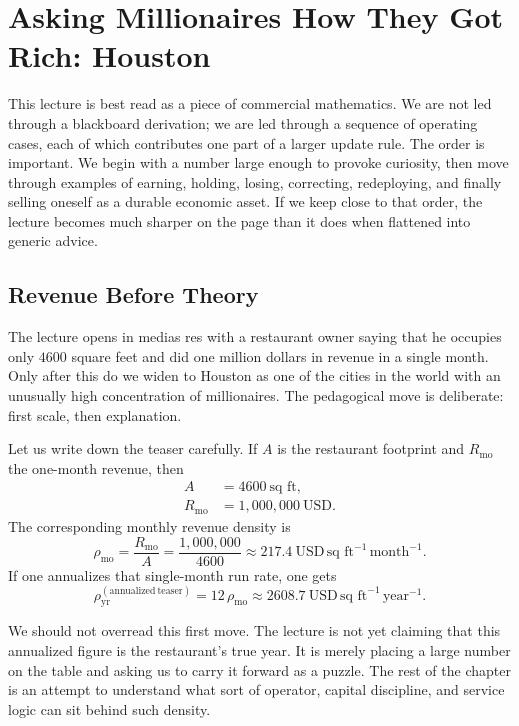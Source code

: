\chapter{Asking Millionaires How They Got Rich: Houston}

This lecture is best read as a piece of commercial mathematics. We are not led through a blackboard derivation; we are led through a sequence of operating cases, each of which contributes one part of a larger update rule. The order is important. We begin with a number large enough to provoke curiosity, then move through examples of earning, holding, losing, correcting, redeploying, and finally selling oneself as a durable economic asset. If we keep close to that order, the lecture becomes much sharper on the page than it does when flattened into generic advice.

\section{Revenue Before Theory}

The lecture opens in medias res with a restaurant owner saying that he occupies only \(4600\) square feet and did one million dollars in revenue in a single month. Only after this do we widen to Houston as one of the cities in the world with an unusually high concentration of millionaires. The pedagogical move is deliberate: first scale, then explanation.

Let us write down the teaser carefully. If \(A\) is the restaurant footprint and \(R_{\mathrm{mo}}\) the one-month revenue, then
\begin{align}
A &= 4600\ \text{sq ft},\\
R_{\mathrm{mo}} &= 1{,}000{,}000\ \text{USD}.
\end{align}
The corresponding monthly revenue density is
\begin{equation}
\rho_{\mathrm{mo}}
=
\frac{R_{\mathrm{mo}}}{A}
=
\frac{1{,}000{,}000}{4600}
\approx
217.4\ \text{USD}\,\text{sq ft}^{-1}\,\text{month}^{-1}.
\end{equation}
If one annualizes that single-month run rate, one gets
\begin{equation}
\rho_{\mathrm{yr}}^{(\mathrm{annualized\ teaser})}
=
12\,\rho_{\mathrm{mo}}
\approx
2608.7\ \text{USD}\,\text{sq ft}^{-1}\,\text{year}^{-1}.
\end{equation}

We should not overread this first move. The lecture is not yet claiming that this annualized figure is the restaurant's true year. It is merely placing a large number on the table and asking us to carry it forward as a puzzle. The rest of the chapter is an attempt to understand what sort of operator, capital discipline, and service logic can sit behind such density.

